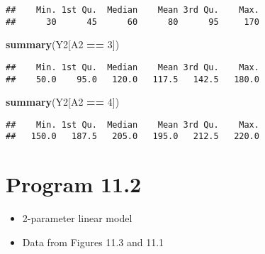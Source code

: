 \documentclass[10pt,]{book}
\newenvironment{Shaded}{\begin{snugshade}}{\end{snugshade}}
\newcommand{\DecValTok}[1]{\textcolor[rgb]{0.00,0.00,0.81}{#1}}
\newcommand{\KeywordTok}[1]{\textcolor[rgb]{0.13,0.29,0.53}{\textbf{#1}}}
\newcommand{\NormalTok}[1]{#1}
\newcommand{\OperatorTok}[1]{\textcolor[rgb]{0.81,0.36,0.00}{\textbf{#1}}}
\newcommand{\StringTok}[1]{\textcolor[rgb]{0.31,0.60,0.02}{#1}}
\providecommand{\tightlist}{%
  \setlength{\itemsep}{0pt}\setlength{\parskip}{0pt}}
\begin{document}
\begin{verbatim}
##    Min. 1st Qu.  Median    Mean 3rd Qu.    Max. 
##      30      45      60      80      95     170
\end{verbatim}

\begin{Shaded}
\begin{Highlighting}[]
\KeywordTok{summary}\NormalTok{(Y2[A2 }\OperatorTok{==}\StringTok{ }\DecValTok{3}\NormalTok{])}
\end{Highlighting}
\end{Shaded}

\begin{verbatim}
##    Min. 1st Qu.  Median    Mean 3rd Qu.    Max. 
##    50.0    95.0   120.0   117.5   142.5   180.0
\end{verbatim}

\begin{Shaded}
\begin{Highlighting}[]
\KeywordTok{summary}\NormalTok{(Y2[A2 }\OperatorTok{==}\StringTok{ }\DecValTok{4}\NormalTok{])}
\end{Highlighting}
\end{Shaded}

\begin{verbatim}
##    Min. 1st Qu.  Median    Mean 3rd Qu.    Max. 
##   150.0   187.5   205.0   195.0   212.5   220.0
\end{verbatim}

\hypertarget{program-11.2}{%
\section{Program 11.2}\label{program-11.2}}

\begin{itemize}
\tightlist
\item
  2-parameter linear model
\item
  Data from Figures 11.3 and 11.1
\end{itemize}
\end{document}
